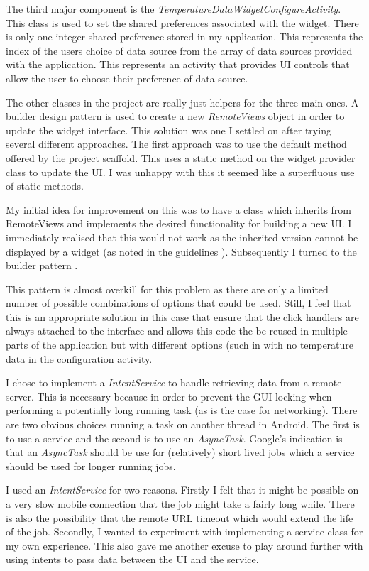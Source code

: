 \documentclass[paper=a4, fontsize=11pt]{scrartcl}	%
\numberwithin{equation}{section}															%
\numberwithin{figure}{section}																%
\numberwithin{table}{section}
\begin{document}
The third major component is the \textit{TemperatureDataWidgetConfigureActivity}. This class is used to set the shared preferences associated with the widget. There is only one integer shared preference stored in my application. This represents the index of the users choice of data source from the array of data sources provided with the application. This represents an activity that provides UI controls that allow the user to choose their preference of data source.

The other classes in the project are really just helpers for the three main ones. A builder design pattern is used to create a new \textit{RemoteViews} object in order to update the widget interface. This solution was one I settled on after trying several different approaches. The first approach was to use the default method offered by the project scaffold. This uses a static method on the widget provider class to update the UI. I was unhappy with this it seemed like a superfluous use of static methods.

 My initial idea for improvement on this was to have a class which inherits from RemoteViews and implements the desired functionality for building a new UI. I immediately realised that this would not work as the inherited version cannot be displayed by a widget (as noted in the guidelines \cite{android-widget-guidelines}). Subsequently I turned to the builder pattern \cite{vlissides1995design}. 
 
 This pattern is almost overkill for this problem as there are only a limited number of possible combinations of options that could be used. Still, I feel that this is an appropriate solution in this case that ensure that the click handlers are always attached to the interface and allows this code the be reused in multiple parts of the application but with different options (such in with no temperature data in the configuration activity.
 
I chose to implement a \textit{IntentService} to handle retrieving data from a remote server. This is necessary because in order to prevent the GUI locking when performing a potentially long running task (as is the case for networking). There are two obvious choices running a task on another thread in Android. The first is to use a service and the second is to use an \textit{AsyncTask}. Google's indication is that an \textit{AsyncTask} should be use for (relatively) short lived jobs which a service should be used for longer running jobs. 

I used an \textit{IntentService} for two reasons. Firstly I felt that it might be possible on a very slow mobile connection that the job might take a fairly long while. There is also the possibility that the remote URL timeout which would extend the life of the job. Secondly, I wanted to experiment with implementing a service class for my own experience. This also gave me another excuse to play around further with using intents to pass data between the UI and the service.
\end{document}
